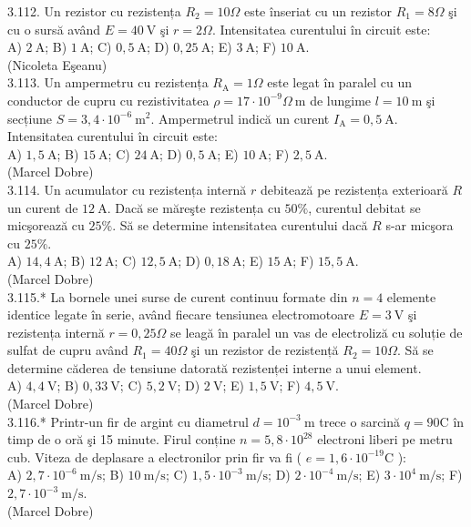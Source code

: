 \documentclass[10pt]{article}
\begin{document}
3.112. Un rezistor cu rezistența $R_{2}=10 \Omega$ este înseriat cu un rezistor $R_{1}=8 \Omega$ şi cu o sursă având $E=40 \mathrm{~V}$ şi $r=2 \Omega$. Intensitatea curentului în circuit este:\\ A) $2 \mathrm{~A}$; B) $1 \mathrm{~A}$; C) $0,5 \mathrm{~A}$; D) $0,25 \mathrm{~A}$; E) $3 \mathrm{~A}$; F) $10 \mathrm{~A}$.\\ (Nicoleta Eşeanu)\\

3.113. Un ampermetru cu rezistența $R_{\mathrm{A}}=1 \Omega$ este legat în paralel cu un conductor de cupru cu rezistivitatea $\rho=17 \cdot 10^{-9} \Omega \mathrm{~m}$ de lungime $l=10 \mathrm{~m}$ şi secțiune $S=3,4 \cdot 10^{-6} \mathrm{~m}^{2}$. Ampermetrul indică un curent $I_{\mathrm{A}}=0,5 \mathrm{~A}$. Intensitatea curentului în circuit este:\\ A) $1,5 \mathrm{~A}$; B) $15 \mathrm{~A}$; C) $24 \mathrm{~A}$; D) $0,5 \mathrm{~A}$; E) $10 \mathrm{~A}$; F) $2,5 \mathrm{~A}$.\\ (Marcel Dobre)\\

3.114. Un acumulator cu rezistența internă $r$ debitează pe rezistența exterioară $R$ un curent de $12 \mathrm{~A}$. Dacă se măreşte rezistența cu $50 \%$, curentul debitat se micşorează cu $25 \%$. Să se determine intensitatea curentului dacă $R$ s-ar micşora cu $25 \%$.\\ A) $14,4 \mathrm{~A}$; B) $12 \mathrm{~A}$; C) $12,5 \mathrm{~A}$; D) $0,18 \mathrm{~A}$; E) $15 \mathrm{~A}$; F) $15,5 \mathrm{~A}$.\\ (Marcel Dobre)\\

3.115.* La bornele unei surse de curent continuu formate din $n=4$ elemente identice legate în serie, având fiecare tensiunea electromotoare $E=3 \mathrm{~V}$ şi rezistența internă $r=0,25 \Omega$ se leagă în paralel un vas de electroliză cu soluție de sulfat de cupru având $R_{1}=40 \Omega$ şi un rezistor de rezistență $R_{2}=10 \Omega$. Să se determine căderea de tensiune datorată rezistenței interne a unui element.\\ A) $4,4 \mathrm{~V}$; B) $0,33 \mathrm{~V}$; C) $5,2 \mathrm{~V}$; D) $2 \mathrm{~V}$; E) $1,5 \mathrm{~V}$; F) $4,5 \mathrm{~V}$.\\ (Marcel Dobre)\\

3.116.* Printr-un fir de argint cu diametrul $d=10^{-3} \mathrm{~m}$ trece o sarcină $q=90 \mathrm{C}$ în timp de o oră şi 15 minute. Firul conține $n=5,8 \cdot 10^{28}$ electroni liberi pe metru cub. Viteza de deplasare a electronilor prin fir va fi ( $e=1,6 \cdot 10^{-19} \mathrm{C}$ ):\\ A) $2,7 \cdot 10^{-6} \mathrm{~m} / \mathrm{s}$; B) $10 \mathrm{~m} / \mathrm{s}$; C) $1,5 \cdot 10^{-3} \mathrm{~m} / \mathrm{s}$; D) $2 \cdot 10^{-4} \mathrm{~m} / \mathrm{s}$; E) $3 \cdot 10^{4} \mathrm{~m} / \mathrm{s}$; F) $2,7 \cdot 10^{-3} \mathrm{~m} / \mathrm{s}$.\\ (Marcel Dobre)\\
\end{document}
